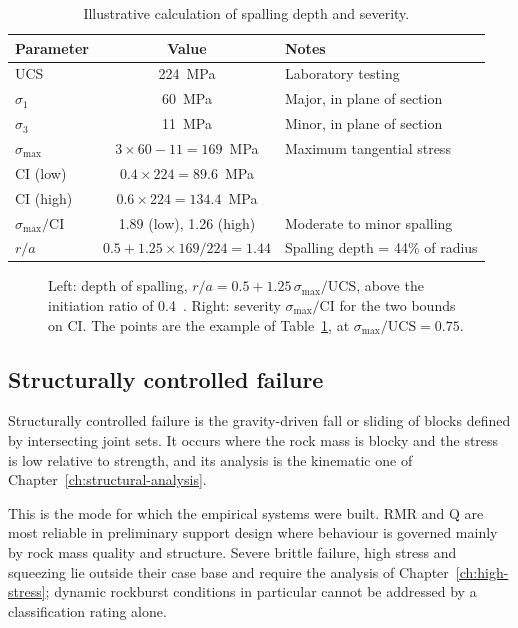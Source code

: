 \begin{table}[htbp]
\caption{Illustrative calculation of spalling depth and severity.}
\label{tab:spalling-example}
\centering
\small
\begin{tabular}{lcl}
\toprule
\textbf{Parameter} & \textbf{Value} & \textbf{Notes} \\
\midrule
UCS & 224~MPa & Laboratory testing \\
$\sigma_1$ & 60~MPa & Major, in plane of section \\
$\sigma_3$ & 11~MPa & Minor, in plane of section \\
$\sigma_{\max}$ & $3\times 60 - 11 = 169$~MPa & Maximum tangential stress \\
CI (low) & $0.4\times224 = 89.6$~MPa & \\
CI (high) & $0.6\times224 = 134.4$~MPa & \\
$\sigma_{\max}/\mathrm{CI}$ & 1.89 (low), 1.26 (high) & Moderate to minor spalling \\
$r/a$ & $0.5 + 1.25\times169/224 = 1.44$ & Spalling depth = 44\% of radius \\
\bottomrule
\end{tabular}
\end{table}

\begin{figure}[htbp]
\centering
{}
\caption{Left: depth of spalling, $r/a = 0.5 + 1.25\,\sigma_{\max}/\mathrm{UCS}$, above the initiation ratio of 0.4~\citep{martin1999spalling}. Right: severity $\sigma_{\max}/\mathrm{CI}$ for the two bounds on CI. The points are the example of Table~\ref{tab:spalling-example}, at $\sigma_{\max}/\mathrm{UCS} = 0.75$.}
\label{fig:spalling-depth}
\end{figure}

\subsection{Structurally controlled failure}
\label{sec:screening-structural}

Structurally controlled failure is the gravity-driven fall or sliding of
blocks defined by intersecting joint sets. It occurs where the rock mass is
blocky and the stress is low relative to strength, and its analysis is the
kinematic one of Chapter~\ref{ch:structural-analysis}.

This is the mode for which the empirical systems were built. RMR and Q are
most reliable in preliminary support design where behaviour is governed
mainly by rock mass quality and structure. Severe brittle failure, high
stress and squeezing lie outside their case base and require the analysis of
Chapter~\ref{ch:high-stress}; dynamic rockburst conditions in particular
cannot be addressed by a classification rating alone.

